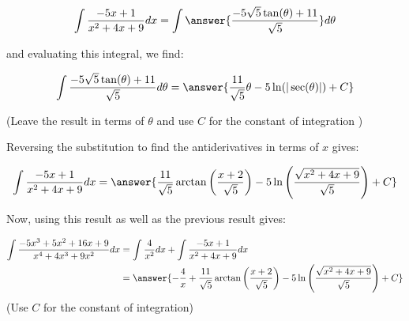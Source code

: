 \documentclass{ximera}
\begin{document}
\begin{exercise}
\begin{exercise}
\begin{exercise}
\begin{exercise}
\[
\int \frac{-5x+1}{x^2+4x+9} dx =\int   \answer{\frac{-5\sqrt{5}\tan(\theta)+11}{\sqrt{5}}}  d\theta
\]

and evaluating this integral, we find:


\[
\int   \frac{-5\sqrt{5}\tan(\theta)+11}{\sqrt{5}}  d\theta = \answer{\frac{11}{\sqrt{5}}\theta -5\ln(|\sec(\theta)|)+C}
\]

(Leave the result in terms of $\theta$ and use $C$ for the constant of integration )

\begin{exercise}

Reversing the substitution to find the antiderivatives in terms of $x$ gives:

\[\int \frac{-5x+1}{x^2+4x+9} dx =\answer{\frac{11}{\sqrt{5}}\arctan\left(\frac{x+2}{\sqrt{5}}\right)
- 5\ln\left(\frac{\sqrt{x^2+4x+9}}{\sqrt{5}}\right) + C}
\]

Now, using this result as well as the previous result gives:

\begin{align*}
\int \frac{-5x^3+5x^2+16x+9}{x^{4}+4x^3+9x^2} dx &= \int \frac{4}{x^2} dx + \int \frac{-5x+1}{x^2+4x+9} dx \\
&=\answer{-\frac{4}{x}+\frac{11}{\sqrt{5}}\arctan\left(\frac{x+2}{\sqrt{5}}\right) - 5\ln\left(\frac{\sqrt{x^2+4x+9}}{\sqrt{5}}\right) + C}
\end{align*}
(Use $C$ for the constant of integration)
 

\end{exercise}
\end{exercise}
\end{exercise}
\end{exercise}
\end{exercise}
\end{document}
